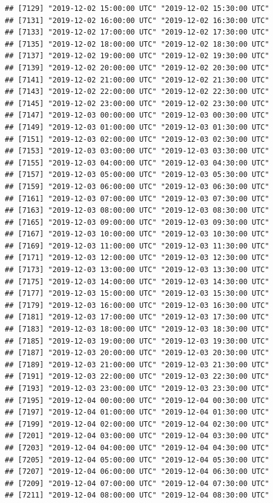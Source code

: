 \documentclass{article}\usepackage[]{graphicx}\usepackage[]{color}
\makeatletter
\newenvironment{kframe}{%
 \def\at@end@of@kframe{}%
 \ifinner\ifhmode%
  \def\at@end@of@kframe{\end{minipage}}%
  \begin{minipage}{\columnwidth}%
 \fi\fi%
 \def\FrameCommand##1{\hskip\@totalleftmargin \hskip-\fboxsep
 \colorbox{shadecolor}{##1}\hskip-\fboxsep
     \hskip-\linewidth \hskip-\@totalleftmargin \hskip\columnwidth}%
 \MakeFramed {\advance\hsize-\width
   \@totalleftmargin\z@ \linewidth\hsize
   \@setminipage}}%
 {\par\unskip\endMakeFramed%
 \at@end@of@kframe}
\newenvironment{knitrout}{}{} %
\makeatother
\begin{document}
\begin{knitrout}
\begin{kframe}
\begin{verbatim}
## [7129] "2019-12-02 15:00:00 UTC" "2019-12-02 15:30:00 UTC"
## [7131] "2019-12-02 16:00:00 UTC" "2019-12-02 16:30:00 UTC"
## [7133] "2019-12-02 17:00:00 UTC" "2019-12-02 17:30:00 UTC"
## [7135] "2019-12-02 18:00:00 UTC" "2019-12-02 18:30:00 UTC"
## [7137] "2019-12-02 19:00:00 UTC" "2019-12-02 19:30:00 UTC"
## [7139] "2019-12-02 20:00:00 UTC" "2019-12-02 20:30:00 UTC"
## [7141] "2019-12-02 21:00:00 UTC" "2019-12-02 21:30:00 UTC"
## [7143] "2019-12-02 22:00:00 UTC" "2019-12-02 22:30:00 UTC"
## [7145] "2019-12-02 23:00:00 UTC" "2019-12-02 23:30:00 UTC"
## [7147] "2019-12-03 00:00:00 UTC" "2019-12-03 00:30:00 UTC"
## [7149] "2019-12-03 01:00:00 UTC" "2019-12-03 01:30:00 UTC"
## [7151] "2019-12-03 02:00:00 UTC" "2019-12-03 02:30:00 UTC"
## [7153] "2019-12-03 03:00:00 UTC" "2019-12-03 03:30:00 UTC"
## [7155] "2019-12-03 04:00:00 UTC" "2019-12-03 04:30:00 UTC"
## [7157] "2019-12-03 05:00:00 UTC" "2019-12-03 05:30:00 UTC"
## [7159] "2019-12-03 06:00:00 UTC" "2019-12-03 06:30:00 UTC"
## [7161] "2019-12-03 07:00:00 UTC" "2019-12-03 07:30:00 UTC"
## [7163] "2019-12-03 08:00:00 UTC" "2019-12-03 08:30:00 UTC"
## [7165] "2019-12-03 09:00:00 UTC" "2019-12-03 09:30:00 UTC"
## [7167] "2019-12-03 10:00:00 UTC" "2019-12-03 10:30:00 UTC"
## [7169] "2019-12-03 11:00:00 UTC" "2019-12-03 11:30:00 UTC"
## [7171] "2019-12-03 12:00:00 UTC" "2019-12-03 12:30:00 UTC"
## [7173] "2019-12-03 13:00:00 UTC" "2019-12-03 13:30:00 UTC"
## [7175] "2019-12-03 14:00:00 UTC" "2019-12-03 14:30:00 UTC"
## [7177] "2019-12-03 15:00:00 UTC" "2019-12-03 15:30:00 UTC"
## [7179] "2019-12-03 16:00:00 UTC" "2019-12-03 16:30:00 UTC"
## [7181] "2019-12-03 17:00:00 UTC" "2019-12-03 17:30:00 UTC"
## [7183] "2019-12-03 18:00:00 UTC" "2019-12-03 18:30:00 UTC"
## [7185] "2019-12-03 19:00:00 UTC" "2019-12-03 19:30:00 UTC"
## [7187] "2019-12-03 20:00:00 UTC" "2019-12-03 20:30:00 UTC"
## [7189] "2019-12-03 21:00:00 UTC" "2019-12-03 21:30:00 UTC"
## [7191] "2019-12-03 22:00:00 UTC" "2019-12-03 22:30:00 UTC"
## [7193] "2019-12-03 23:00:00 UTC" "2019-12-03 23:30:00 UTC"
## [7195] "2019-12-04 00:00:00 UTC" "2019-12-04 00:30:00 UTC"
## [7197] "2019-12-04 01:00:00 UTC" "2019-12-04 01:30:00 UTC"
## [7199] "2019-12-04 02:00:00 UTC" "2019-12-04 02:30:00 UTC"
## [7201] "2019-12-04 03:00:00 UTC" "2019-12-04 03:30:00 UTC"
## [7203] "2019-12-04 04:00:00 UTC" "2019-12-04 04:30:00 UTC"
## [7205] "2019-12-04 05:00:00 UTC" "2019-12-04 05:30:00 UTC"
## [7207] "2019-12-04 06:00:00 UTC" "2019-12-04 06:30:00 UTC"
## [7209] "2019-12-04 07:00:00 UTC" "2019-12-04 07:30:00 UTC"
## [7211] "2019-12-04 08:00:00 UTC" "2019-12-04 08:30:00 UTC"

\end{verbatim}
\end{kframe}
\end{knitrout}
\end{document}

